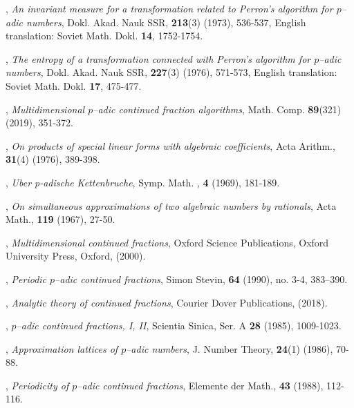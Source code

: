 \documentclass[12pt, reqno]{amsart}
\theoremstyle{plain}
\theoremstyle{definition}
\begin{document}
\begin{thebibliography}{}
,
\textit{An invariant measure for a transformation related to Perron’s algorithm for $p$--adic numbers},
\newblock Dokl. Akad. Nauk SSR, \textbf{213}(3) (1973), 536-537, English translation: Soviet Math. Dokl. \textbf{14}, 1752-1754.

,
\textit{The entropy of a transformation connected with Perron’s algorithm for $p$--adic numbers},
\newblock Dokl. Akad. Nauk SSR, \textbf{227}(3) (1976),  571-573, English translation: Soviet Math. Dokl. \textbf{17}, 475-477.

,
\textit{Multidimensional $p$--adic continued fraction algorithms},
\newblock Math. Comp. \textbf{89}(321) (2019), 351-372.

,
\textit{On products of special linear forms with algebraic coefficients},
\newblock Acta Arithm., \textbf{31}(4) (1976), 389-398.

,
\textit{Uber p-adische Kettenbruche},
\newblock Symp. Math. , \textbf{4} (1969), 181-189.

,
\textit{On simultaneous approximations of two algebraic numbers by rationals},
\newblock Acta Math., \textbf{119} (1967), 27-50.

,
\textit{Multidimensional continued fractions},
\newblock Oxford Science Publications, Oxford University Press, Oxford, (2000).

,
\textit{Periodic $p$--adic continued fractions},
\newblock Simon Stevin, \textbf{64} (1990), no. 3-4, 383–390.

,
\textit{Analytic theory of continued fractions},
\newblock Courier Dover Publications, (2018).

,
\textit{$p$--adic continued fractions, I, II},
\newblock Scientia Sinica, Ser. A \textbf{28} (1985), 1009-1023.

,
\textit{Approximation lattices of $p$--adic numbers},
\newblock J. Number Theory, \textbf{24}(1) (1986), 70-88.

,
\textit{Periodicity of $p$--adic continued fractions},
\newblock Elemente der Math., \textbf{43} (1988), 112-116.
\end{thebibliography}
\end{document}
